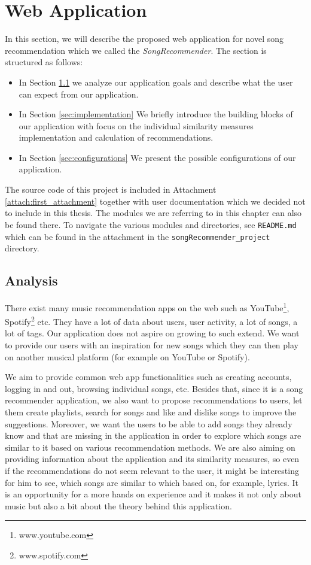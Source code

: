 \chapter{Web Application}\label{chap:web_app}

In this section, we will describe the proposed web application for novel song recommendation which we called the \textit{SongRecommender}. The section is structured as follows: 
\begin{itemize}
    \item In Section \ref{sec:analysis} we analyze our application goals and describe what the user can expect from our application.
    \item In Section \ref{sec:implementation} We briefly introduce the building blocks of our application with focus on the individual similarity measures implementation and calculation of recommendations.
    \item In Section \ref{sec:configurations} We present the possible configurations of our application.
\end{itemize}

 The source code of this project is included in Attachment \ref{attach:first_attachment} together with user documentation which we decided not to include in this thesis. The modules we are referring to in this chapter can also be found there. To navigate the various modules and directories, see \texttt{README.md} which can be found in the attachment in the \texttt{songRecommender\_project} directory.
 
\section{Analysis}\label{sec:analysis}

There exist many music recommendation apps on the web such as YouTube\footnote{www.youtube.com}, Spotify\footnote{www.spotify.com} etc. They have a lot of data about users, user activity, a lot of songs, a lot of tags. Our application does not aspire on growing to such extend. We want to provide our users with an inspiration for new songs which they can then play on another musical platform (for example on YouTube or Spotify). 

We aim to provide common web app functionalities such as creating accounts, logging in and out, browsing individual songs, etc. Besides that, since it is a song recommender application, we also want to propose recommendations to users, let them create playlists, search for songs and like and dislike songs to improve the suggestions. Moreover, we want the users to be able to add songs they already know and that are missing in the application in order to explore which songs are similar to it based on various recommendation methods. We are also aiming on providing information about the application and its similarity measures, so even if the recommendations do not seem relevant to the user, it might be interesting for him to see, which songs are similar to which based on, for example, lyrics. It is an opportunity for a more hands on experience and it makes it not only about music but also a bit about the theory behind this application. 

